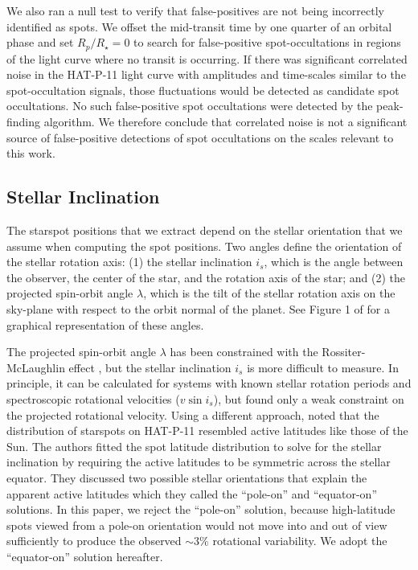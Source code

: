 We also ran a null test to verify that false-positives are not being incorrectly identified as spots. We offset the mid-transit time by one quarter of an orbital phase and set $R_p/R_\star = 0$ to search for false-positive spot-occultations in regions of the light curve where no transit is occurring. If there was significant correlated noise in the HAT-P-11 light curve with amplitudes and time-scales similar to the spot-occultation signals, those fluctuations would be detected as candidate spot occultations. No such false-positive spot occultations were detected by the peak-finding algorithm. We therefore conclude that correlated noise is not a significant source of false-positive detections of spot occultations on the scales relevant to this work.

\subsection{Stellar Inclination} \label{sec:i_s}

The starspot positions that we extract depend on the stellar orientation that we assume when computing the spot positions. Two angles define the orientation of the stellar rotation axis: (1) the stellar inclination $i_s$, which is the angle between the observer, the center of the star, and the rotation axis of the star; and (2) the projected spin-orbit angle $\lambda$, which is the tilt of the stellar rotation axis on the sky-plane with respect to the orbit normal of the planet. See Figure 1 of \citet{Fabrycky2009} for a graphical representation of these angles. 

The projected spin-orbit angle $\lambda$ has been constrained with the Rossiter-McLaughlin effect \citep{Winn2010, Hirano2011}, but the stellar inclination $i_s$ is more difficult to measure. In principle, it can be calculated for systems with known stellar rotation periods and spectroscopic rotational velocities ($v \sin i_s$), but \citet{Bakos2010} found only a weak constraint on the projected rotational velocity. 
Using a different approach, \citet{Sanchis-Ojeda2011} noted that the distribution of starspots on HAT-P-11 resembled active latitudes like those of the Sun. The authors fitted the spot latitude distribution to solve for the stellar inclination by requiring the active latitudes to be symmetric across the stellar equator. They discussed two possible stellar orientations that explain the apparent active latitudes which they called the ``pole-on'' and ``equator-on'' solutions. In this paper, we reject the ``pole-on'' solution, because high-latitude spots viewed from a pole-on orientation would not move into and out of view sufficiently to produce the observed $\sim 3$\% rotational variability. We adopt the ``equator-on'' solution hereafter.

